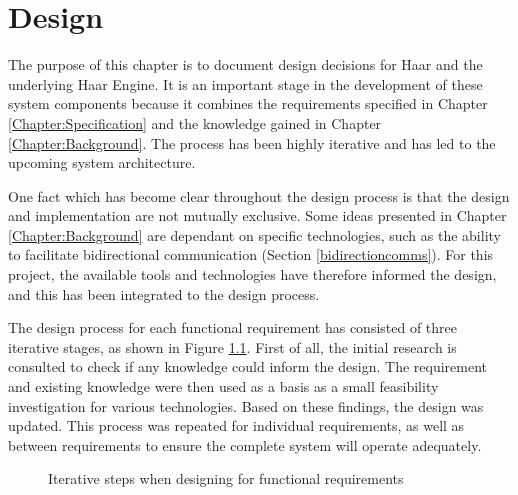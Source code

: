 \chapter{Design}
\label{chapter:design}
   The purpose of this chapter is to document design decisions for Haar and the underlying Haar Engine. It is an important stage in the development of these system components because it combines the requirements specified in Chapter \ref{Chapter:Specification} and the knowledge gained in Chapter \ref{Chapter:Background}. The process has been highly iterative and has led to the upcoming system architecture. 

   One fact which has become clear throughout the design process is that the design and implementation are not mutually exclusive. Some ideas presented in Chapter \ref{Chapter:Background} are dependant on specific technologies, such as the ability to facilitate bidirectional communication (Section \ref{bidirectioncomms}). For this project, the available tools and technologies have therefore informed the design, and this has been integrated to the design process.

   The design process for each functional requirement has consisted of three iterative stages, as shown in Figure \ref{figure:design-process}. First of all, the initial research is consulted to check if any knowledge could inform the design. The requirement and existing knowledge were then used as a basis as a small feasibility investigation for various technologies. Based on these findings, the design was updated. This process was repeated for individual requirements, as well as between requirements to ensure the complete system will operate adequately.

   \begin{figure}
    \centering
    \caption{Iterative steps when designing for functional requirements}\label{figure:design-process}
  \end{figure}

